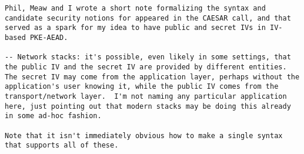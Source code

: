 \begin{minipage}{\textwidth}
\begin{lstlisting}
Phil, Meaw and I wrote a short note formalizing the syntax and candidate security notions for appeared in the CAESAR call, and that served as a spark for my idea to have public and secret IVs in IV-based PKE-AEAD.

-- Network stacks: it's possible, even likely in some settings, that the public IV and the secret IV are provided by different entities.  The secret IV may come from the application layer, perhaps without the application's user knowing it, while the public IV comes from the transport/network layer.  I'm not naming any particular application here, just pointing out that modern stacks may be doing this already in some ad-hoc fashion.

Note that it isn't immediately obvious how to make a single syntax that supports all of these. 
\end{lstlisting}

\end{minipage} 